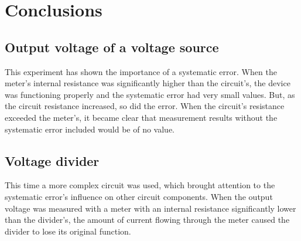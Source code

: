 \section{Conclusions}

\subsection{Output voltage of a voltage source}

 This experiment has shown the importance of a systematic error. When the meter's internal resistance was significantly higher than the circuit's, the device was functioning properly and the systematic error had very small values. But, as the circuit resistance increased, so did the error. When the circuit's resistance exceeded the meter's, it became clear that measurement results without the systematic error included would be of no value.

\subsection{Voltage divider}

This time a more complex circuit was used, which brought attention to the systematic error's influence on other circuit components. When the output voltage was measured with a meter with an internal resistance significantly lower than the divider's, the amount of current flowing through the meter caused the divider to lose its original function.
